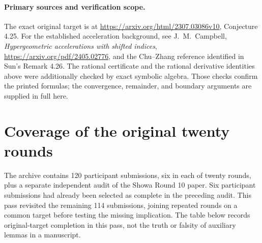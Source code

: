 \documentclass[11pt,a4paper]{article}
\theoremstyle{remark}\newtheorem{remark}[theorem]{Remark}
\numberwithin{equation}{section}
\begin{document}
\paragraph{Primary sources and verification scope.}
The exact original target is at
\url{https://arxiv.org/html/2307.03086v10}, Conjecture 4.25.
For the established acceleration background, see J.~M.~Campbell,
\emph{Hypergeometric accelerations with shifted indices},
\url{https://arxiv.org/pdf/2405.02776}, and the Chu--Zhang reference
identified in Sun's Remark 4.26. The rational certificate and the
rational derivative identities above were additionally checked by exact
symbolic algebra. Those checks confirm the printed formulas; the
convergence, remainder, and boundary arguments are supplied in full here.
\clearpage\appendix
\section{Coverage of the original twenty rounds}
The archive contains 120 participant submissions, six in each of twenty
rounds, plus a separate independent audit of the Showa Round 10 paper.
Six participant submissions had already been selected as complete in the
preceding audit. This pass revisited the remaining 114 submissions, joining
repeated rounds on a common target before testing the missing implication.
The table below records original-target completion in this pass, not the
truth or falsity of auxiliary lemmas in a manuscript.
\end{document}

